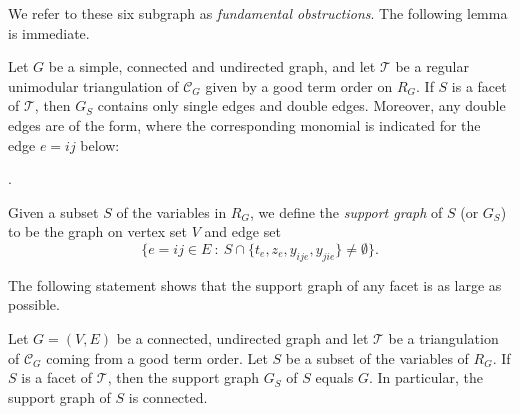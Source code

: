 We refer to these six subgraph as \emph{fundamental obstructions}. 
The following lemma is immediate.
\begin{lemm}
    \label{lem: only double}
    Let $G$ be a simple, connected and undirected graph, and let $\mathcal{T}$ be a regular unimodular triangulation of $\mathcal{C}_G$ given by a good term order on $R_G$.  
    If $S$ is a facet of $\mathcal{T}$, then $G_S$ contains only single edges and double edges. 
    Moreover, any double edges are of the form, where the corresponding monomial is indicated for the edge $e=ij$ below:
    \begin{center}
    .
    \end{center}
\end{lemm}

Given a subset $S$ of the variables in $R_G$, we define the \emph{support graph} of $S$ (or $G_S$) to be the graph on vertex set $V$ and edge set 
\[
\{e=ij\in E~:~S\cap\{t_e,z_e,y_{ije},y_{jie}\}\neq \emptyset\}.
\]

The following statement shows that the support graph of any facet is as large as possible.

\begin{prop}
\label{prop: connected}
Let $G=(V,E)$ be a connected, undirected graph and let $\mathcal{T}$ be a triangulation of $\mathcal{C}_G$ coming from a good term order. Let $S$ be a subset of the variables of $R_G$. If $S$ is a facet of $\mathcal{T}$, then the support graph $G_S$ of $S$ equals $G$. In particular, the support graph of $S$ is connected.
\end{prop}


